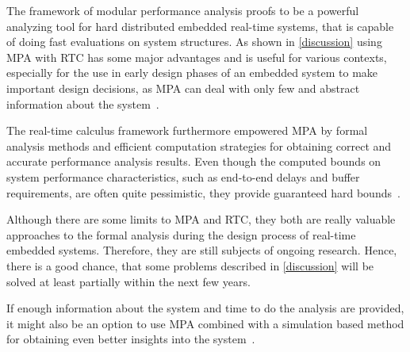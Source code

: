 \label{conclusion}

The framework of modular performance analysis proofs to be a powerful analyzing tool for hard distributed embedded real-time systems, 
that is capable of doing fast evaluations on system structures.
As shown in \autoref{discussion} using MPA with RTC has some major advantages and is useful for various contexts, 
especially for the use in early design phases of an embedded system to make important design decisions, as MPA can deal with only few and abstract information about the system~\cite{wan:06}.

The real-time calculus framework furthermore empowered MPA by formal analysis methods and efficient computation strategies for obtaining correct and accurate performance analysis results.
Even though the computed bounds on system performance characteristics, such as end-to-end delays and buffer requirements, are often quite pessimistic, they provide guaranteed hard bounds~\cite{wan:06}.

Although there are some limits to MPA and RTC, they both are really valuable approaches to the formal analysis during the design process of real-time embedded systems.
Therefore, they are still subjects of ongoing research.
Hence, there is a good chance, that some problems described in \autoref{discussion} will be solved at least partially within the next few years.

If enough information about the system and time to do the analysis are provided, it might also be an option to 
use MPA combined with a simulation based method for obtaining even better insights into the system~\cite{wan:06}.